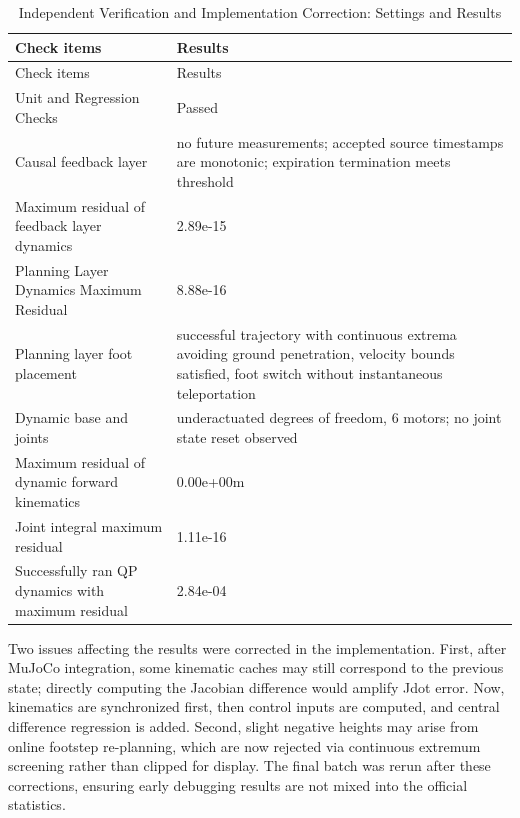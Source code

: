\FloatBarrier\begingroup\small\setlength{\tabcolsep}{2.5pt}
\begin{longtable}[]{@{}
  >{\raggedright\arraybackslash}p{}
  >{\raggedright\arraybackslash}p{}@{}}
\caption{Independent Verification and Implementation Correction: Settings and Results}\label{tab:s21-2}\tabularnewline
\toprule\noalign{}
\begin{minipage}[b]{\linewidth}\raggedright
Check items
\end{minipage} & \begin{minipage}[b]{\linewidth}\raggedright
Results
\end{minipage} \\
\midrule\noalign{}
\endfirsthead
\toprule\noalign{}
\begin{minipage}[b]{\linewidth}\raggedright
Check items
\end{minipage} & \begin{minipage}[b]{\linewidth}\raggedright
Results
\end{minipage} \\
\midrule\noalign{}
\endhead
\bottomrule\noalign{}
\endlastfoot
Unit and Regression Checks & 11 Passed \\
Causal feedback layer & no future measurements; accepted source timestamps are monotonic; expiration termination meets threshold \\
Maximum residual of feedback layer dynamics & 2.89e-15 \\
Planning Layer Dynamics Maximum Residual & 8.88e-16 \\
Planning layer foot placement & successful trajectory with continuous extrema avoiding ground penetration, velocity bounds satisfied, foot switch without instantaneous teleportation \\
Dynamic base and joints & 3 underactuated degrees of freedom, 6 motors; no joint state reset observed \\
Maximum residual of dynamic forward kinematics & 0.00e+00m \\
Joint integral maximum residual & 1.11e-16 \\
Successfully ran QP dynamics with maximum residual & 2.84e-04 \\
\end{longtable}\endgroup

Two issues affecting the results were corrected in the implementation. First, after MuJoCo integration, some kinematic caches may still correspond to the previous state; directly computing the Jacobian difference would amplify Jdot error. Now, kinematics are synchronized first, then control inputs are computed, and central difference regression is added. Second, slight negative heights may arise from online footstep re-planning, which are now rejected via continuous extremum screening rather than clipped for display. The final batch was rerun after these corrections, ensuring early debugging results are not mixed into the official statistics.

